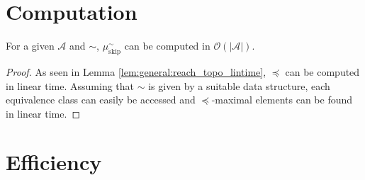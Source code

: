\section{Computation}

\begin{lem}
\label{lem:skip:skip_aut_linear_time}
	For a given $\mathcal{A}$ and $\sim$, $\mu_\text{skip}^\sim$ can be computed in $\mathcal{O}(|\mathcal{A}|)$.
\end{lem}

\begin{proof}
	As seen in Lemma \ref{lem:general:reach_topo_lintime}, $\preceq$ can be computed in linear time. Assuming that $\sim$ is given by a suitable data structure, each equivalence class can easily be accessed and $\preceq$-maximal elements can be found in linear time.
\end{proof}





\section{Efficiency}

